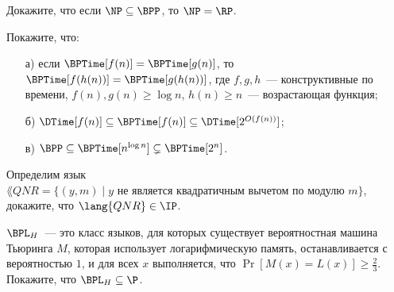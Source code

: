 \begin{ptask}{40}
    Докажите, что если $\NP \subseteq \BPP$, то $\NP = \RP$.
\end{ptask}

\begin{ptask}{44}
    Покажите, что:
	\begin{enumerate}[topsep = 0pt, itemsep = -1ex]
        \item [а)] если $\BPTime[f(n)] = \BPTime[g(n)]$, то $\BPTime[f(h(n))] = \BPTime[g(h(n))]$, где $f, g, h$~---
			конструктивные по времени, $f(n), g(n) \ge \log n$, $h(n) \ge n$~--- возрастающая функция;
        \item [б)] $\DTime[f(n)] \subseteq \BPTime[f(n)] \subseteq \DTime[2^{O(f(n))}]$;
        \item [в)] $\BPP \subseteq \BPTime[n^{\log n}] \subsetneq \BPTime[2^n]$.
    \end{enumerate}
\end{ptask}

\begin{ptask}{45}
    Определим язык $\lang{QNR} = \{(y, m) \mid \text{$y$ не является квадратичным вычетом по модулю $m$}\}$, докажите, что
    $\lang{QNR} \in \IP$.
\end{ptask}

\begin{ptask}{46}
    $\BPL_H$~--- это класс языков, для которых существует вероятностная машина Тьюринга $M$, которая использует логарифмическую
    память, останавливается с вероятностью $1$, и для всех $x$ выполняется, что $\Pr[M(x) = L(x)] \ge \frac{2}{3}$. Покажите, что
    $\BPL_H \subseteq \P$.
\end{ptask}
